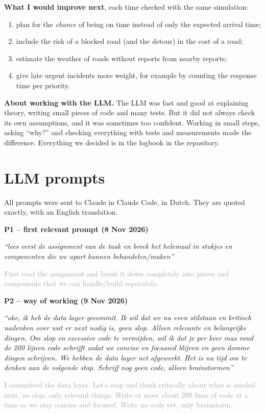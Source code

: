 \documentclass[11pt,a4paper]{article}
\begin{document}
\textbf{What I would improve next}, each time checked with the same simulation:
\begin{enumerate}
  \item plan for the \emph{chance} of being on time instead of only the expected
    arrival time;
  \item include the risk of a blocked road (and the detour) in the cost of a
    road;
  \item estimate the weather of roads without reports from nearby reports;
  \item give late urgent incidents more weight, for example by counting the
    response time per priority.
\end{enumerate}

\textbf{About working with the LLM.} The LLM was fast and good at explaining
theory, writing small pieces of code and many tests. But it did not always check
its own assumptions, and it was sometimes too confident. Working in small steps,
asking ``why?'' and checking everything with tests and measurements made the
difference. Everything we decided is in the logbook in the repository.

\newpage
\section*{LLM prompts}

All prompts were sent to Claude in Claude Code, in Dutch. They are quoted
exactly, with an English translation.

\newcommand{\prompt}[3]{%
  \par\noindent\textbf{#1}\par
  \noindent\textit{``#2''}\par
  \noindent\textcolor{darkgray}{#3}\par\medskip}

\prompt{P1 -- first relevant prompt (8 Nov 2026)}
  {lees eerst de assignment van de taak en breek het helemaal in stukjes en componenten die we apart kunnen behandelen/maken}
  {First read the assignment and break it down completely into pieces and components that we can handle/build separately.}

\prompt{P2 -- way of working (9 Nov 2026)}
  {oke, ik heb de data layer gecommit. Ik wil dat we nu even stilstaan en kritisch nadenken over wat er next nodig is, geen slop. Alleen relevante en belangrijke dingen. Om slop en excessive code te vermijden, wil ik dat je per keer max rond de 200 lijnen code schrijft zodat we concise en focussed blijven en geen domme dingen schrijven. We hebben de data layer net afgewerkt. Het is nu tijd om te denken aan de volgende stap. Schrijf nog geen code, alleen brainstormen}
  {I committed the data layer. Let's stop and think critically about what is needed next, no slop, only relevant things. Write at most about 200 lines of code at a time so we stay concise and focused. Write no code yet, only brainstorm.}
\end{document}
